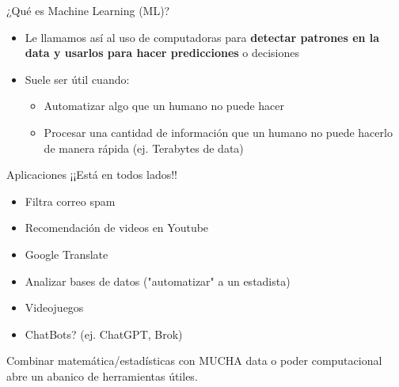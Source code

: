 \documentclass[11pt,handout,aspectratio=169]{beamer}
\begin{document}
	
\begin{frame}{¿Qué es Machine Learning (ML)?}

\begin{itemize}
\item Le llamamos así al uso de computadoras para \textbf{detectar patrones en la data y usarlos para hacer predicciones} o decisiones
\vspace{0.8cm}
\item Suele ser útil cuando: 
\begin{itemize}
\item Automatizar algo que un humano no puede hacer 
\vspace{0.5cm}
\item Procesar una cantidad de información que un humano no puede hacerlo de manera rápida (ej. Terabytes de data)
\end{itemize}
\end{itemize}

\end{frame}


\begin{frame}{Aplicaciones}
¡¡Está en todos lados!!
\begin{itemize}
\item Filtra correo spam
\item Recomendación de videos en Youtube
\item Google Translate
\item Analizar bases de datos ("automatizar" a un estadista)
\item Videojuegos
\item ChatBots? (ej. ChatGPT, Brok)
\end{itemize}
\vspace{0.8cm}

Combinar matemática/estadísticas con MUCHA data o poder computacional abre un abanico de herramientas útiles.
\end{frame}
	
\end{document}
